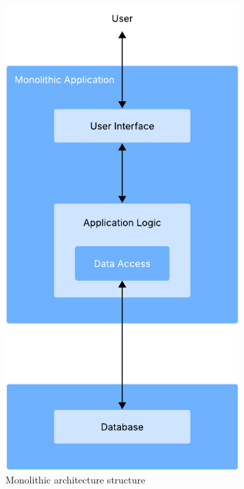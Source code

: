 \begin{figure}[htbp]
	\centering
	\includegraphics[width=0.8\textwidth, height=0.5\textheight, keepaspectratio]{Chapters/Figures/Architectures/Monolith.pdf}
	\caption{Monolithic architecture structure}
	\label{fig:architectures:monolithic}
\end{figure}

